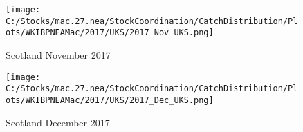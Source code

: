 \documentclass{article}
\begin{document}
\begin{figure}
	\centering
		\texttt{[image: C:/Stocks/mac.27.nea/StockCoordination/CatchDistribution/Plots/WKIBPNEAMac/2017/UKS/2017\_Nov\_UKS.png]}
	\caption{Scotland November 2017}
	\label{fig:2017_Nov_UKS}
\end{figure}

\begin{figure}
	\centering
		\texttt{[image: C:/Stocks/mac.27.nea/StockCoordination/CatchDistribution/Plots/WKIBPNEAMac/2017/UKS/2017\_Dec\_UKS.png]}
	\caption{Scotland December 2017}
	\label{fig:2017_Dec_UKS}
\end{figure}
\end{document}
